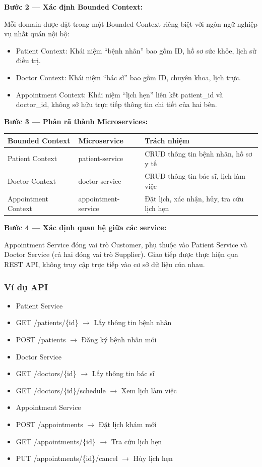 \documentclass[12pt,a4paper]{article}
\begin{document}
\textbf{Bước 2 --- Xác định Bounded Context:}

Mỗi domain được đặt trong một Bounded Context riêng biệt với ngôn ngữ nghiệp vụ nhất quán nội bộ:
\begin{itemize}
  \item Patient Context: Khái niệm ``bệnh nhân'' bao gồm ID, hồ sơ sức khỏe, lịch sử điều trị.
  \item Doctor Context: Khái niệm ``bác sĩ'' bao gồm ID, chuyên khoa, lịch trực.
  \item Appointment Context: Khái niệm ``lịch hẹn'' liên kết patient\_id và doctor\_id, không sở hữu trực tiếp thông tin chi tiết của hai bên.
\end{itemize}

\textbf{Bước 3 --- Phân rã thành Microservices:}

\begin{longtable}{p{4cm}p{4cm}p{6cm}}
\toprule
\textbf{Bounded Context} & \textbf{Microservice} & \textbf{Trách nhiệm} \\
\midrule
Patient Context & patient-service & CRUD thông tin bệnh nhân, hồ sơ y tế \\
Doctor Context & doctor-service & CRUD thông tin bác sĩ, lịch làm việc \\
Appointment Context & appointment-service & Đặt lịch, xác nhận, hủy, tra cứu lịch hẹn \\
\bottomrule
\end{longtable}

\textbf{Bước 4 --- Xác định quan hệ giữa các service:}

Appointment Service đóng vai trò Customer, phụ thuộc vào Patient Service và Doctor Service
(cả hai đóng vai trò Supplier). Giao tiếp được thực hiện qua REST API, không truy cập trực tiếp
vào cơ sở dữ liệu của nhau.

\subsubsection{Ví dụ API}
\begin{itemize}
  \item Patient Service
  \item GET /patients/\{id\} $\rightarrow$ Lấy thông tin bệnh nhân
  \item POST /patients $\rightarrow$ Đăng ký bệnh nhân mới
  \item Doctor Service
  \item GET /doctors/\{id\} $\rightarrow$ Lấy thông tin bác sĩ
  \item GET /doctors/\{id\}/schedule $\rightarrow$ Xem lịch làm việc
  \item Appointment Service
  \item POST /appointments $\rightarrow$ Đặt lịch khám mới
  \item GET /appointments/\{id\} $\rightarrow$ Tra cứu lịch hẹn
  \item PUT /appointments/\{id\}/cancel $\rightarrow$ Hủy lịch hẹn
\end{itemize}
\end{document}
